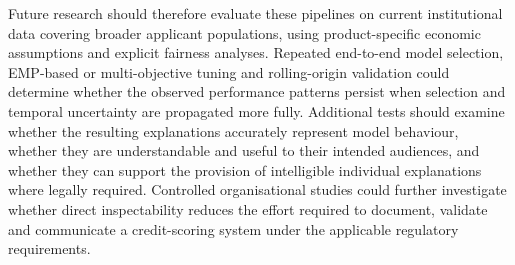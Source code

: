 Future research should therefore evaluate these pipelines on current institutional data covering broader applicant populations, using product-specific economic assumptions and explicit fairness analyses. Repeated end-to-end model selection, EMP-based or multi-objective tuning and rolling-origin validation could determine whether the observed performance patterns persist when selection and temporal uncertainty are propagated more fully. Additional tests should examine whether the resulting explanations accurately represent model behaviour, whether they are understandable and useful to their intended audiences, and whether they can support the provision of intelligible individual explanations where legally required. Controlled organisational studies could further investigate whether direct inspectability reduces the effort required to document, validate and communicate a credit-scoring system under the applicable regulatory requirements.


